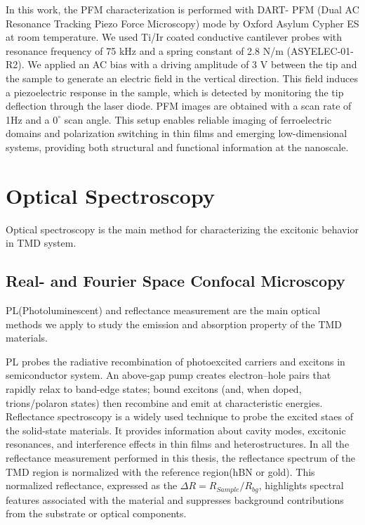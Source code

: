 In this work, the PFM characterization is performed with DART- PFM (Dual AC Resonance Tracking Piezo Force Microscopy) mode by Oxford Asylum Cypher ES at room temperature. 
We used Ti/Ir coated conductive cantilever probes with resonance frequency of 75 kHz and a spring constant of 2.8 N/m (ASYELEC-01-R2).
We applied an AC bias with a driving amplitude of 3 V between the tip and the sample to generate an electric field in the vertical direction. 
This field induces a piezoelectric response in the sample, which is detected by monitoring the tip deflection through the laser diode. 
PFM images are obtained with a scan rate of 1Hz and a $0^{\circ}$ scan angle.
This setup enables reliable imaging of ferroelectric domains and polarization switching in thin films and emerging low-dimensional systems, providing both structural and functional information at the nanoscale.

\section{Optical Spectroscopy}
\label{sec:Optical Spectroscopy}
Optical spectroscopy is the main method for characterizing the excitonic behavior in TMD system. 

\subsection{Real- and Fourier Space Confocal Microscopy}
PL(Photoluminescent) and reflectance measurement are the main optical methods we apply to study the emission and absorption property of the TMD materials.

PL probes the radiative recombination of photoexcited carriers and excitons in semiconductor system.
An above-gap pump creates electron–hole pairs that rapidly relax to band-edge states; bound excitons (and, when doped, trions/polaron states) then recombine and emit at characteristic energies. 
Reflectance spectroscopy is a widely used technique to probe the excited staes of the solid-state materials. 
It provides information about cavity modes, excitonic resonances, and interference effects in thin films and heterostructures.  
In all the reflectance measurement performed in this thesis, the reflectance spectrum of the TMD region is normalized with the reference region(hBN or gold). 
This normalized reflectance, expressed as the $\Delta R = R_{Sample}/R_{bg}$, highlights spectral features associated with the material and suppresses background contributions from the substrate or optical components.

